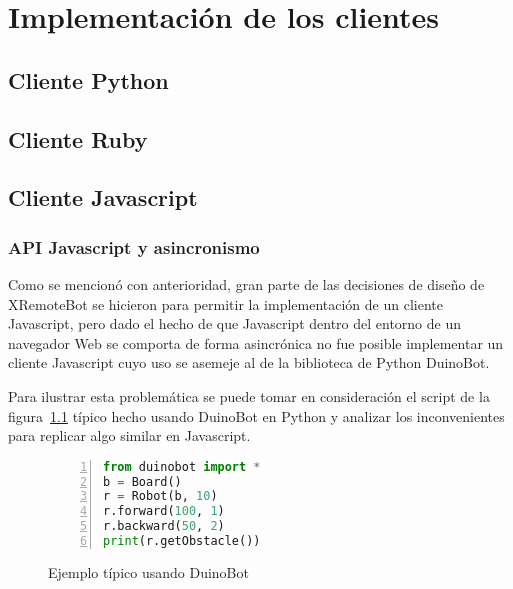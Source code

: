 
\chapter{Implementación de los clientes}\label{ch4}

\section{Cliente Python}\label{ch4:python}
\section{Cliente Ruby}\label{ch4:ruby}
\section{Cliente Javascript}\label{ch4:javascript}

\subsection{API Javascript y asincronismo}
Como se mencionó con anterioridad, gran parte de las decisiones de diseño de XRemoteBot
se hicieron para permitir la implementación de un cliente Javascript, pero dado el hecho
de que Javascript dentro del entorno de un navegador Web se comporta de forma asincrónica
no fue posible implementar un cliente Javascript cuyo uso se asemeje al de la biblioteca
de Python DuinoBot.

Para ilustrar esta problemática se puede tomar en consideración el script de la
figura~\ref{lst:ejemplo_duinobot}
típico hecho usando DuinoBot en Python y analizar los inconvenientes para replicar
algo similar en Javascript.

\begin{figure}
    \begin{lstlisting}[language=Python,numbers=left]
from duinobot import *
b = Board()
r = Robot(b, 10)
r.forward(100, 1)
r.backward(50, 2)
print(r.getObstacle())
    \end{lstlisting}
    \caption{Ejemplo típico usando DuinoBot}
    \label{lst:ejemplo_duinobot}
\end{figure}

